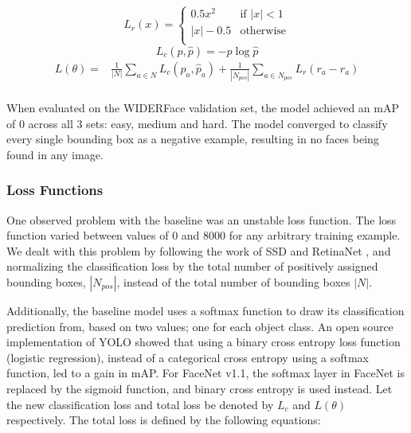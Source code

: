 \documentclass[a4paper, twoside]{article}
\begin{document}
\begin{equation}\label{eqfacenetsoftmax}
L_r(x) = \begin{cases}
				0.5x^2 & \mbox{if } |x| < 1\\
				|x| - 0.5 & \mbox{otherwise}\\
			\end{cases}
\end{equation}
\begin{equation}\label{eqsmoothl1loss}
L_c(p, \hat{p}) = -p \log{\hat{p}}
\end{equation}
\begin{equation}
\begin{split}
	L(\theta) = &  \frac{1}{|N|} \sum_{a \in N} L_c(p_a, \hat{p}_a) 
	 + \frac{1}{|N_{pos}|} \sum_{a \in N_{pos}} L_r(r_a - \hat{r}_a)  \\ 
\end{split}
\end{equation}

When evaluated on the WIDERFace validation set, the model achieved an mAP of 0 across all 3 sets: easy, medium and hard. The model converged to classify every single bounding box as a negative example, resulting in no faces being found in any image.

\subsubsection{Loss Functions}
One observed problem with the baseline was an unstable loss function. The loss function varied between values of 0 and 8000 for any arbitrary training example. We dealt with this problem by following the work of SSD \cite{ssd} and RetinaNet \cite{retinanet}, and normalizing the classification loss by the total number of positively assigned bounding boxes, $|N_{pos}|$, instead of the total number of bounding boxes $|N|$.

Additionally, the baseline model uses a softmax function to draw its classification prediction from, based on two values; one for each object class. An open source implementation of YOLO \cite{sigmoidvssoftmax} showed that using a binary cross entropy loss function (logistic regression), instead of a categorical cross entropy using a softmax function, led to a gain in mAP. For FaceNet v1.1, the softmax layer in FaceNet is replaced by the sigmoid function, and binary cross entropy is used instead. Let the new classification loss and total loss be denoted by $L_c$ and $L(\theta)$ respectively. The total loss is defined by the following equations:
\end{document}
